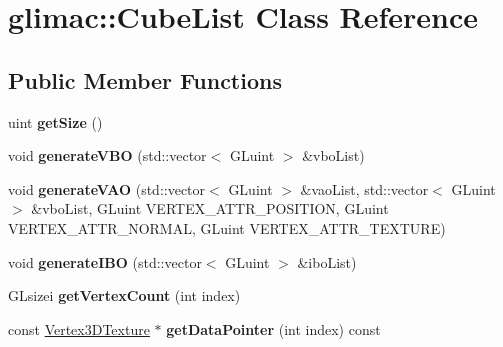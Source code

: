 \hypertarget{classglimac_1_1CubeList}{}\section{glimac\+:\+:Cube\+List Class Reference}
\label{classglimac_1_1CubeList}
\subsection*{Public Member Functions}
\begin{DoxyCompactItemize}
\item 
\mbox{\label{classglimac_1_1CubeList_a22bdb56a8ad725631572e517234ac775}} 
uint {\bfseries get\+Size} ()
\item 
\mbox{\label{classglimac_1_1CubeList_a9f1f9610374316111c544fb9a669e98d}} 
void {\bfseries generate\+V\+BO} (std\+::vector$<$ G\+Luint $>$ \&vbo\+List)
\item 
\mbox{\label{classglimac_1_1CubeList_a84ac9d8e1419a24c072768e63d6f5269}} 
void {\bfseries generate\+V\+AO} (std\+::vector$<$ G\+Luint $>$ \&vao\+List, std\+::vector$<$ G\+Luint $>$ \&vbo\+List, G\+Luint V\+E\+R\+T\+E\+X\+\_\+\+A\+T\+T\+R\+\_\+\+P\+O\+S\+I\+T\+I\+ON, G\+Luint V\+E\+R\+T\+E\+X\+\_\+\+A\+T\+T\+R\+\_\+\+N\+O\+R\+M\+AL, G\+Luint V\+E\+R\+T\+E\+X\+\_\+\+A\+T\+T\+R\+\_\+\+T\+E\+X\+T\+U\+RE)
\item 
\mbox{\label{classglimac_1_1CubeList_ac4c7e839ca242cf6a793faa0a0ef113a}} 
void {\bfseries generate\+I\+BO} (std\+::vector$<$ G\+Luint $>$ \&ibo\+List)
\item 
\mbox{\label{classglimac_1_1CubeList_aba84c9ac9d87bedca07244b8d4525c1d}} 
G\+Lsizei {\bfseries get\+Vertex\+Count} (int index)
\item 
\mbox{\label{classglimac_1_1CubeList_a990f5d349a4b6fd690f8b61d0ebacd7f}} 
const \hyperlink{structglimac_1_1Vertex3DTexture}{Vertex3\+D\+Texture} $\ast$ {\bfseries get\+Data\+Pointer} (int index) const
\item 
\mbox{\label{classglimac_1_1CubeList_a317ef23831d1ec198f69586bcd5fa749}} 

\end{DoxyCompactItemize}

